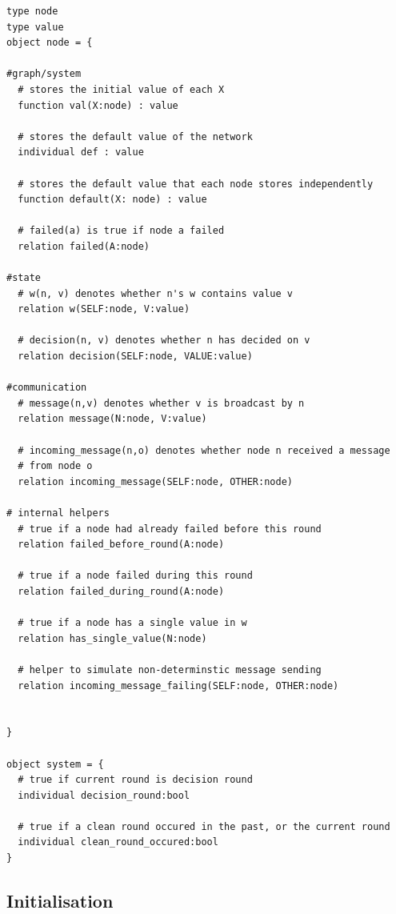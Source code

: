 \documentclass[fleqn]{article}
\begin{document}
\begin{mdframed}[backgroundcolor=light-gray, roundcorner=10pt,leftmargin=1, rightmargin=1, innerleftmargin=15, innertopmargin=15,innerbottommargin=15, outerlinewidth=1, linecolor=light-gray]
\begin{lstlisting}
type node
type value
object node = {

#graph/system
  # stores the initial value of each X
  function val(X:node) : value

  # stores the default value of the network
  individual def : value

  # stores the default value that each node stores independently
  function default(X: node) : value

  # failed(a) is true if node a failed
  relation failed(A:node)

#state
  # w(n, v) denotes whether n's w contains value v
  relation w(SELF:node, V:value)

  # decision(n, v) denotes whether n has decided on v
  relation decision(SELF:node, VALUE:value)

#communication
  # message(n,v) denotes whether v is broadcast by n
  relation message(N:node, V:value)

  # incoming_message(n,o) denotes whether node n received a message
  # from node o
  relation incoming_message(SELF:node, OTHER:node)

# internal helpers
  # true if a node had already failed before this round
  relation failed_before_round(A:node)

  # true if a node failed during this round
  relation failed_during_round(A:node)

  # true if a node has a single value in w
  relation has_single_value(N:node)

  # helper to simulate non-determinstic message sending
  relation incoming_message_failing(SELF:node, OTHER:node)


}

object system = {
  # true if current round is decision round
  individual decision_round:bool

  # true if a clean round occured in the past, or the current round
  individual clean_round_occured:bool
}
\end{lstlisting}
\end{mdframed}

\subsection{Initialisation}
\end{document}
